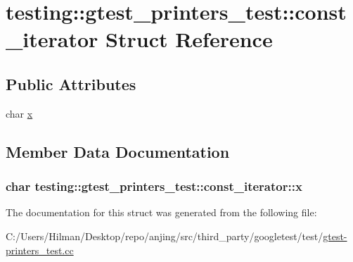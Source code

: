 \hypertarget{structtesting_1_1gtest__printers__test_1_1const__iterator}{}\section{testing\+:\+:gtest\+\_\+printers\+\_\+test\+:\+:const\+\_\+iterator Struct Reference}
\label{structtesting_1_1gtest__printers__test_1_1const__iterator}
\subsection*{Public Attributes}
\begin{DoxyCompactItemize}
\item 
char \hyperlink{structtesting_1_1gtest__printers__test_1_1const__iterator_a4412dbc1c37c2bc5211971f0c8176d6b}{x}
\end{DoxyCompactItemize}


\subsection{Member Data Documentation}
\hypertarget{structtesting_1_1gtest__printers__test_1_1const__iterator_a4412dbc1c37c2bc5211971f0c8176d6b}{}
\subsubsection[{x}]{\setlength{\rightskip}{0pt plus 5cm}char testing\+::gtest\+\_\+printers\+\_\+test\+::const\+\_\+iterator\+::x}\label{structtesting_1_1gtest__printers__test_1_1const__iterator_a4412dbc1c37c2bc5211971f0c8176d6b}


The documentation for this struct was generated from the following file\+:\begin{DoxyCompactItemize}
\item 
C\+:/\+Users/\+Hilman/\+Desktop/repo/anjing/src/third\+\_\+party/googletest/test/\hyperlink{gtest-printers__test_8cc}{gtest-\/printers\+\_\+test.\+cc}\end{DoxyCompactItemize}
